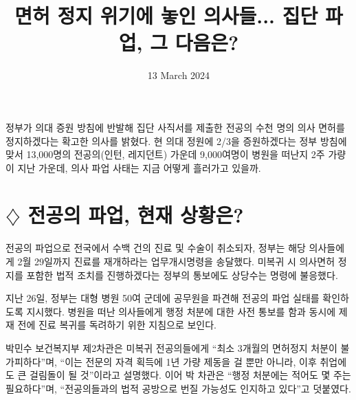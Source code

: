 \documentclass{translation}
\date{13 March 2024}
\title{면허 정지 위기에 놓인 의사들... 집단 파업, 그 다음은?}
\begin{document}
정부가 의대 증원 방침에 반발해 집단 사직서를 제출한 전공의 수천 명의 의사 면허를 정지하겠다는 확고한 의사를 밝혔다.
현 의대 정원에 2/3을 증원하겠다는 정부 방침에 맞서 13,000명의 전공의(인턴, 레지던트) 가운데 9,000여명이 병원을 떠난지 2주 가량이 지난 가운데,
의사 파업 사태는 지금 어떻게 흘러가고 있을까.

\section*{\( \diamondsuit \) 전공의 파업, 현재 상황은?} 
전공의 파업으로 전국에서 수백 건의 진료 및 수술이 취소되자, 정부는 해당 의사들에게 2월 29일까지 진료를 재개하라는 업무개시명령을 송달했다.
미복귀 시 의사면허 정지를 포함한 법적 조치를 진행하겠다는 정부의 통보에도 상당수는 명령에 불응했다.

지난 26일, 정부는 대형 병원 50여 군데에 공무원을 파견해 전공의 파업 실태를 확인하도록 지시했다.
병원을 떠난 의사들에게 행정 처분에 대한 사전 통보를 함과 동시에 제재 전에 진료 복귀를 독려하기 위한 지침으로 보인다.

박민수 보건복지부 제2차관은 미복귀 전공의들에게 ``최소 3개월의 면허정지 처분이 불가피하다''며, ``이는 전문의 자격 획득에 1년 가량 제동을 걸 뿐만 아니라, 이후 취업에도 큰 걸림돌이 될 것''이라고 설명했다.
이어 박 차관은 ``행정 처분에는 적어도 몇 주는 필요하다''며, ``전공의들과의 법적 공방으로 번질 가능성도 인지하고 있다''고 덧붙였다.
\end{document}

